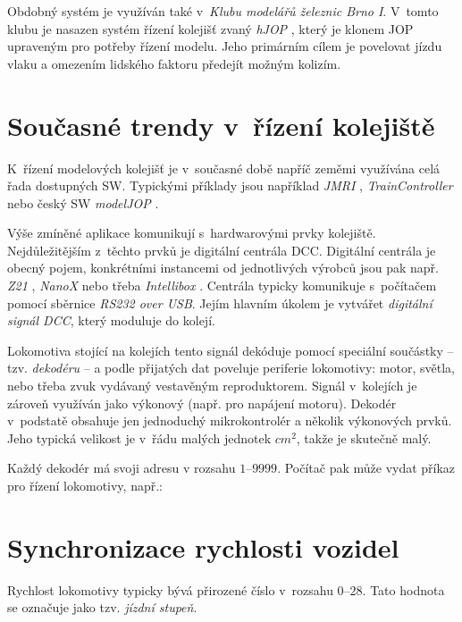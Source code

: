 Obdobný systém je využíván také v~\textit{Klubu modelářů železnic Brno I}.
V~tomto klubu je nasazen systém řízení kolejišť zvaný \textit{hJOP}
\cite{hjop:web}, který je klonem JOP upraveným pro potřeby řízení modelu. Jeho
primárním cílem je povelovat jízdu vlaku a omezením lidského faktoru předejít
možným kolizím.

\section{Současné trendy v~řízení kolejiště}

K~řízení modelových kolejišť je v~současné době napříč zeměmi využívána celá
řada dostupných SW. Typickými příklady jsou například \textit{JMRI}
\cite{jmri:web}, \textit{TrainController} \cite{traincontroller:web}
nebo český SW \textit{modelJOP} \cite{modeljop:web}.

Výše zmíněné aplikace komunikují s~hardwarovými prvky kolejiště.
Nejdůležitějším z~těchto prvků je digitální centrála DCC. Digitální centrála je
obecný pojem, konkrétními instancemi od jednotlivých výrobců jsou pak např.
\textit{Z21} \cite{z21:web}, \textit{NanoX} \cite{nanox:web} nebo třeba
\textit{Intellibox} \cite{intellibox:web}. Centrála typicky komunikuje
s~počítačem pomocí sběrnice \textit{RS232 over USB}. Jejím hlavním úkolem je
vytvářet \textit{digitální signál DCC}, který moduluje do kolejí.

Lokomotiva stojící na kolejích tento signál dekóduje pomocí spe\-ciál\-ní
součástky -- tzv. \textit{dekodéru} -- a podle přijatých dat poveluje periferie
lokomotivy: motor, světla, nebo třeba zvuk vydávaný vestavěným reproduktorem.
Signál v~kolejích je zároveň využíván jako výkonový (např. pro napájení
motoru). Dekodér v~podstatě obsahuje jen jednoduchý mikrokontrolér a několik
výkonových prvků. Jeho typická velikost je v~řádu malých jednotek $cm^2$, takže
je skutečně malý.

Každý dekodér má svoji adresu v rozsahu $1$--$9999$. Počítač pak může vydat příkaz
pro řízení lokomotivy, např.: \textit{}

\section{Synchronizace rychlosti vozidel}

Rychlost lokomotivy typicky bývá přirozené číslo v~rozsahu $0$--$28$. Tato
hodnota se označuje jako tzv. \textit{jízdní stupeň}.

